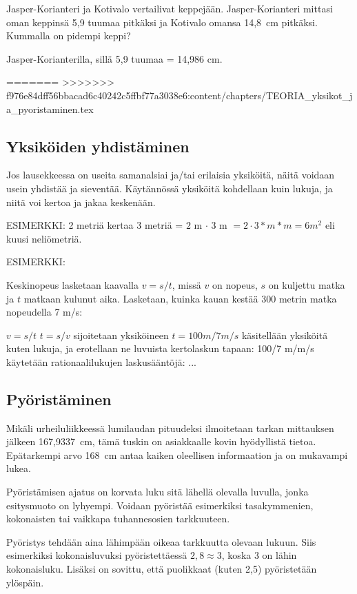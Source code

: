 \begin{tehtava}
Jasper-Korianteri ja Kotivalo vertailivat keppejään. Jasper-Korianteri mittasi oman keppinsä 5,9 tuumaa pitkäksi ja Kotivalo omansa 14,8~cm pitkäksi. Kummalla on pidempi keppi?
\begin{vastaus}
Jasper-Korianterilla, sillä 5,9 tuumaa = 14,986 cm.
\end{vastaus}
\end{tehtava}
=======
>>>>>>> f976e84dff56bbacad6c40242c5ffbf77a3038e6:content/chapters/TEORIA_yksikot_ja_pyoristaminen.tex

\subsection{Yksiköiden yhdistäminen}

Jos lausekkeessa on useita samanalsiai ja/tai erilaisia yksiköitä, näitä voidaan usein yhdistää ja sieventää. Käytännössä yksiköitä kohdellaan kuin lukuja, ja niitä voi kertoa ja jakaa keskenään.

ESIMERKKI:
 2 metriä kertaa 3 metriä = $2$ m $\cdot$ $3$ m $=2 \cdot 3 * m * m=6 m^2$ eli kuusi neliömetriä. 

ESIMERKKI:

Keskinopeus lasketaan kaavalla $v=s/t$, missä $v$ on nopeus, $s$ on kuljettu matka ja $t$ matkaan kulunut aika. Lasketaan, kuinka kauan kestää 300 metrin matka nopeudella 7 m/s:

$v=s/t$
$t=s/v$ sijoitetaan yksiköineen
$t=100 m / 7 m/s$
käsitellään yksiköitä kuten lukuja, ja erotellaan ne luvuista kertolaskun tapaan:
100/7 m/m/s
käytetään rationaalilukujen laskusääntöjä:
...

\subsection*{Pyöristäminen}

Mikäli urheiluliikkeessä lumilaudan pituudeksi ilmoitetaan tarkan mittauksen jälkeen 167,9337~cm, tämä tuskin on asiakkaalle kovin hyödyllistä tietoa. Epätarkempi arvo 168~cm antaa kaiken oleellisen informaation ja on mukavampi lukea.

Pyöristämisen ajatus on korvata luku sitä lähellä olevalla luvulla, jonka esitysmuoto on lyhyempi. Voidaan pyöristää
esimerkiksi tasakymmenien, kokonaisten tai vaikkapa tuhannesosien
tarkkuuteen.

Pyöristys tehdään aina lähimpään oikeaa tarkkuutta olevaan lukuun. Siis esimerkiksi kokonaisluvuksi pyöristettäessä $2,8 \approx 3$, koska 3 on lähin kokonaisluku. Lisäksi on sovittu, että
puolikkaat (kuten 2,5) pyöristetään ylöspäin.

